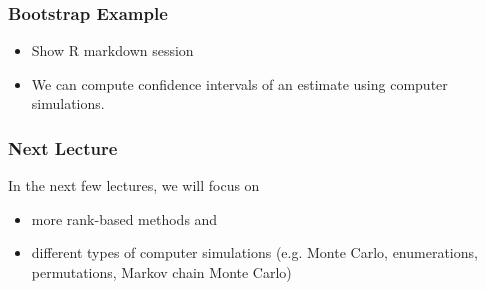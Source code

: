 \documentclass[10pt]{beamer}
\begin{document}
\begin{frame}
\frametitle{Bootstrap Example}

\begin{itemize}
\item Show R markdown session
\item We can compute confidence intervals of an estimate using computer simulations.
\end{itemize}

\end{frame}

\begin{frame}
\frametitle{Next Lecture}

In the next few lectures, we will focus on
\begin{itemize}
\item more rank-based methods and 
\item different types of computer simulations (e.g. Monte Carlo, enumerations, permutations, Markov chain Monte Carlo)
\end{itemize}

\end{frame}
\end{document}
